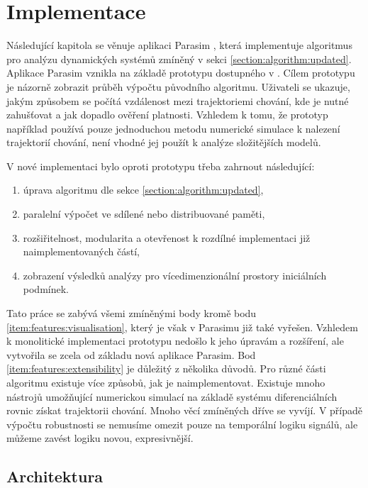 \chapter{Implementace}
Následující kapitola se věnuje aplikaci Parasim \cite{TODO}, která implementuje algoritmus pro
analýzu dynamických systémů zmíněný v sekci \ref{section:algorithm:updated}. Aplikace Parasim
vznikla na základě prototypu dostupného v \cite{drazan2011}. Cílem prototypu je názorně
zobrazit průběh výpočtu původního algoritmu. Uživateli se ukazuje, jakým způsobem
se počítá vzdálenost mezi trajektoriemi chování, kde je nutné zahušťovat a jak dopadlo
ověření platnosti. Vzhledem k tomu, že prototyp například používá pouze jednoduchou metodu
numerické simulace k nalezení trajektorií chování, není vhodné jej použít k analýze složitějších modelů.

V nové implementaci bylo oproti prototypu třeba zahrnout následující:

\begin{enumerate}
	\item	úprava algoritmu dle sekce \ref{section:algorithm:updated},
	\item	paralelní výpočet ve sdílené nebo distribuované paměti,
	\item	rozšiřitelnost, modularita a otevřenost k rozdílné implementaci již naimplementovaných částí,\label{item:features:extensibility}
	\item	zobrazení výsledků analýzy pro vícedimenzionální prostory ini\-ciál\-ních podmínek.\label{item:features:visualisation}
\end{enumerate}

Tato práce se zabývá všemi zmíněnými body kromě bodu \ref{item:features:visualisation},
který je však v Parasimu již také vyřešen. Vzhledem k monolitické implementaci prototypu
nedošlo k jeho úpravám a rozšíření, ale vytvořila se zcela od základu nová aplikace Parasim.
Bod \ref{item:features:extensibility} je důležitý z několika důvodů. Pro různé části algoritmu
existuje více způsobů, jak je naimplementovat. Existuje mnoho nástrojů umožňující
numerickou simulací na základě systému diferenciálních rovnic získat trajektorii chování.
Mnoho věcí zmíněných dříve se vyvíjí. V případě výpočtu robustnosti se nemusíme omezit
pouze na temporální logiku signálů, ale můžeme zavést logiku novou, expresivněj\-ší.

\section{Architektura}

